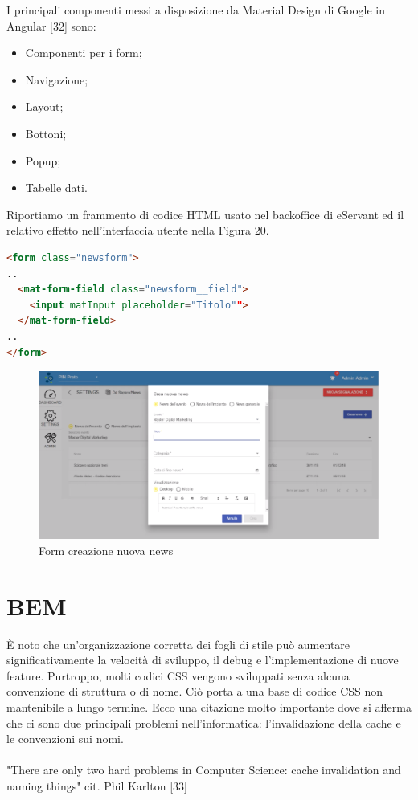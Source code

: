 I principali componenti messi a disposizione da Material Design di Google in Angular [32] sono:

\begin{itemize}
    \item Componenti per i form;
    \item Navigazione;
    \item Layout;
    \item Bottoni;
    \item Popup;
    \item Tabelle dati.
\end{itemize}

Riportiamo un frammento di codice HTML usato nel backoffice di eServant ed il relativo effetto
nell'interfaccia utente nella Figura 20.

\begin{lstlisting}[language=html]
<form class="newsform">
..
  <mat-form-field class="newsform__field">
    <input matInput placeholder="Titolo"">
  </mat-form-field>
..
</form>
\end{lstlisting}

\begin{figure}[H]
    \centering  
    \caption{Form creazione nuova news}
    \includegraphics[scale=0.4]{img/cap3/backoffice-form}
\end{figure}

\section{BEM}
È noto che un'organizzazione corretta dei fogli di stile può aumentare significativamente la velocità
di sviluppo, il debug e l'implementazione di nuove feature. Purtroppo, molti codici CSS vengono
sviluppati senza alcuna convenzione di struttura o di nome. Ciò porta a una base di codice CSS 
non mantenibile a lungo termine.
Ecco una citazione molto importante dove si afferma che ci sono due principali problemi nell'informatica: l'invalidazione della cache e le convenzioni sui nomi.\\\\
"There are only two hard problems in Computer Science: cache invalidation and naming things" cit. Phil Karlton [33]\\

